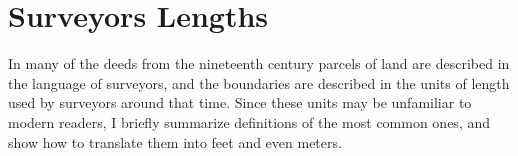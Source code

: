 \documentclass[
  12pt,
]{book}
\begin{document}
\hypertarget{section}{%
\section{}\label{section}}

\hypertarget{surveyors-lengths}{%
\section{Surveyors Lengths}\label{surveyors-lengths}}

In many of the deeds from the nineteenth century parcels of land are described in the language of surveyors, and the boundaries are described in the units of length used by surveyors around that time. Since these units may be unfamiliar to modern readers, I briefly summarize definitions of the most common ones, and show how to translate them into feet and even meters.
\end{document}
